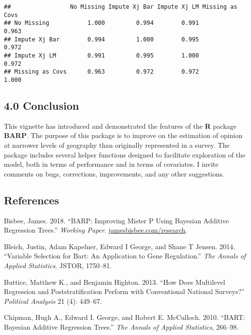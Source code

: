 \documentclass[]{article}
\begin{document}
\begin{verbatim}
##                 No Missing Impute Xj Bar Impute Xj LM Missing as Covs
## No Missing           1.000         0.994        0.991           0.963
## Impute Xj Bar        0.994         1.000        0.995           0.972
## Impute Xj LM         0.991         0.995        1.000           0.972
## Missing as Covs      0.963         0.972        0.972           1.000
\end{verbatim}

\subsection{4.0 Conclusion}\label{conclusion}

This vignette has introduced and demonstrated the features of the
\textbf{R} package \textbf{BARP}. The purpose of this package is to
improve on the estimation of opinion at narrower levels of geography
than originally represented in a survey. The package includes several
helper functions designed to facilitate exploration of the model, both
in terms of performance and in terms of covariates. I invite comments on
bugs, corrections, improvements, and any other suggestions.

\subsection*{References}\label{references}

\hypertarget{refs}{}
\hypertarget{ref-bisbee2018barp}{}
Bisbee, James. 2018. ``BARP: Improving Mister P Using Bayesian Additive
Regression Trees.'' \emph{Working Paper}.
\url{jamesbisbee.com/research}.

\hypertarget{ref-bleich2014variable}{}
Bleich, Justin, Adam Kapelner, Edward I George, and Shane T Jensen.
2014. ``Variable Selection for Bart: An Application to Gene
Regulation.'' \emph{The Annals of Applied Statistics}. JSTOR, 1750--81.

\hypertarget{ref-buttice_how_2013}{}
Buttice, Matthew K., and Benjamin Highton. 2013. ``How Does Multilevel
Regression and Poststratification Perform with Conventional National
Surveys?'' \emph{Political Analysis} 21 (4): 449--67.

\hypertarget{ref-chipman_bart:_2010}{}
Chipman, Hugh A., Edward I. George, and Robert E. McCulloch. 2010.
``BART: Bayesian Additive Regression Trees.'' \emph{The Annals of
Applied Statistics}, 266--98.
\end{document}
